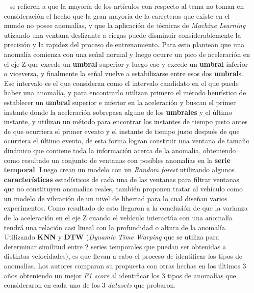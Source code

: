 		~ se refieren a que la mayoría de los artículos con respecto al tema no toman en consideración el hecho que la gran
		mayoría de la carreteras que existe en el mundo no posee anomalías, y que la aplicación de técnicas de \emph{Machine Learning} utizando una
		ventana deslizante a ciegas puede disminuir considerablemente la precisión y la rapidez del proceso de entrenamiento. Para esto plantean que
		una anomalía comienza con una señal normal y luego ocurre un pico de aceleración en el eje Z que excede un \textbf{umbral} superior y luego
		cae y excede un \textbf{umbral} inferior o viceversa, y finalmente la señal vuelve a estabilizarse entre esos dos \textbf{umbral}s. Ese
		intervalo es el que consideran como el intervalo candidato en el que puede haber una anomalía, y para encontrarlo utilizan primero el método
		heurístico de establecer un \textbf{umbral} superior e inferior en la aceleración y buscan el primer instante donde la aceleración sobrepasa
		alguno de los \textbf{umbrales} y el último instante, y utilizan un método para encontrar los instantes de tiempo justo antes de que ocurriera
		el primer evento y el instante de tiempo justo después de que ocurriera el último evento, de esta forma logran construir una ventana de tamaño
		dinámico que contiene toda la información acerca de la anomalía, obteniendo como resultado un conjunto de ventanas con posibles anomalías en
		la \textbf{serie temporal}. Luego crean un modelo con un \emph{Random forest} utilizando algunos \textbf{características} estadísticos de cada una de las ventanas
		para filtrar ventanas que no constituyen anomalías reales, también proponen tratar al vehículo como un modelo de vibración de un nivel de
		libertad para lo cual diseñan varios experimentos. Como resultado de esto llegaron a la conclusión de que la varianza de la aceleración en el
		eje Z cuando el vehículo interactúa con una anomalía tendrá una relación casi lineal con la profundidad o altura de la anomalía. Utilizando
		\textbf{KNN} y \textbf{DTW} (\emph{Dynamic Time Warping} que se utiliza para determinar similitud entre 2 series temporales que puedan ser
		obtenidas a distintas velocidades), es que llevan a cabo el proceso de identificar los tipos de anomalías. Los autores comparan su propuesta
		con otras hechas en los últimos 3 años obteniendo un mejor \emph{F1 score} al identificar los 3 tipos de anomalías que consideraron en cada
		uno de los 3 \emph{datasets} que probaron.\\


